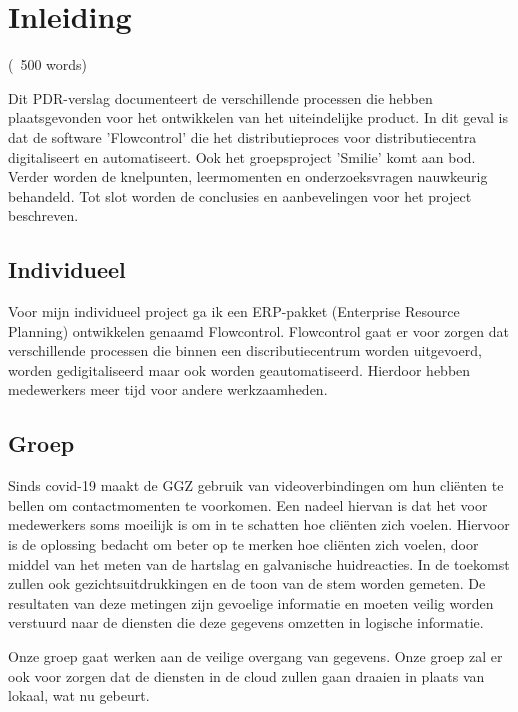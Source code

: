 \chapter{Inleiding}
\label{ch:introduction}
(~500 words)

Dit PDR-verslag documenteert de verschillende processen die hebben plaatsgevonden voor het ontwikkelen van het
uiteindelijke product.
In dit geval is dat de software 'Flowcontrol' die het distributieproces voor distributiecentra digitaliseert en
automatiseert.
Ook het groepsproject 'Smilie' komt aan bod.
Verder worden de knelpunten, leermomenten en onderzoeksvragen nauwkeurig behandeld.
Tot slot worden de conclusies en aanbevelingen voor het project beschreven.


\section*{Individueel}
Voor mijn individueel project ga ik een ERP-pakket (Enterprise Resource Planning) ontwikkelen genaamd Flowcontrol.
Flowcontrol gaat er voor zorgen dat verschillende processen die binnen een discributiecentrum worden uitgevoerd,
worden gedigitaliseerd maar ook worden geautomatiseerd.
Hierdoor hebben medewerkers meer tijd voor andere werkzaamheden.

\section*{Groep}
Sinds covid-19 maakt de GGZ gebruik van videoverbindingen om hun cliënten te bellen om contactmomenten te voorkomen.
Een nadeel hiervan is dat het voor medewerkers soms moeilijk is om in te schatten hoe cliënten zich voelen.
Hiervoor is de oplossing bedacht om beter op te merken hoe cliënten zich voelen, door middel van het meten van de
hartslag en
galvanische huidreacties.
In de toekomst zullen ook gezichtsuitdrukkingen en de toon van de stem worden gemeten.
De resultaten van deze metingen zijn gevoelige informatie en moeten veilig worden verstuurd naar de diensten die deze gegevens omzetten in logische informatie.

Onze groep gaat werken aan de veilige overgang van gegevens.
Onze groep zal er ook voor zorgen dat de diensten in de cloud zullen gaan draaien in plaats van lokaal, wat nu gebeurt.
